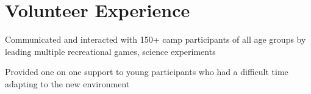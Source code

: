 \documentclass[]{morris-cv}
\begin{document}
\begin{minipage}[t]{0.67\textwidth}



\section{Volunteer Experience}
\begin{tightemize}
    \item Communicated and interacted with 150+ camp participants of all age groups by leading multiple recreational games, science experiments
    \item Provided one on one support to young participants who had a difficult time adapting to the new environment
\end{tightemize}
\sectionsep
\end{minipage} 
\end{document}
